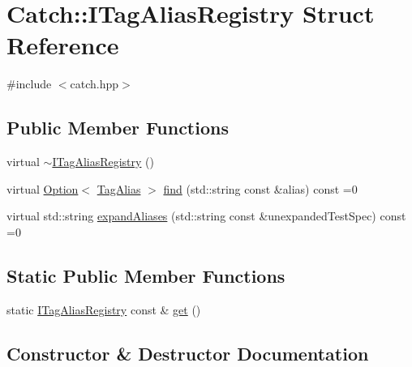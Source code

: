 \hypertarget{struct_catch_1_1_i_tag_alias_registry}{}\section{Catch\+:\+:I\+Tag\+Alias\+Registry Struct Reference}
\label{struct_catch_1_1_i_tag_alias_registry}


{\ttfamily \#include $<$catch.\+hpp$>$}

\subsection*{Public Member Functions}
\begin{DoxyCompactItemize}
\item 
virtual \mbox{\hyperlink{struct_catch_1_1_i_tag_alias_registry_a8967db4dd40b68e22697eff0f4928239}{$\sim$\+I\+Tag\+Alias\+Registry}} ()
\item 
virtual \mbox{\hyperlink{class_catch_1_1_option}{Option}}$<$ \mbox{\hyperlink{struct_catch_1_1_tag_alias}{Tag\+Alias}} $>$ \mbox{\hyperlink{struct_catch_1_1_i_tag_alias_registry_a7d2fba4d39cfcc62c2695fcde4f989c3}{find}} (std\+::string const \&alias) const =0
\item 
virtual std\+::string \mbox{\hyperlink{struct_catch_1_1_i_tag_alias_registry_ae729a7532faf7466db1a157ce0395170}{expand\+Aliases}} (std\+::string const \&unexpanded\+Test\+Spec) const =0
\end{DoxyCompactItemize}
\subsection*{Static Public Member Functions}
\begin{DoxyCompactItemize}
\item 
static \mbox{\hyperlink{struct_catch_1_1_i_tag_alias_registry}{I\+Tag\+Alias\+Registry}} const  \& \mbox{\hyperlink{struct_catch_1_1_i_tag_alias_registry_aa9d0f008f49473389c7abf6071f137a7}{get}} ()
\end{DoxyCompactItemize}


\subsection{Constructor \& Destructor Documentation}
\mbox{\label{struct_catch_1_1_i_tag_alias_registry_a8967db4dd40b68e22697eff0f4928239}} 
